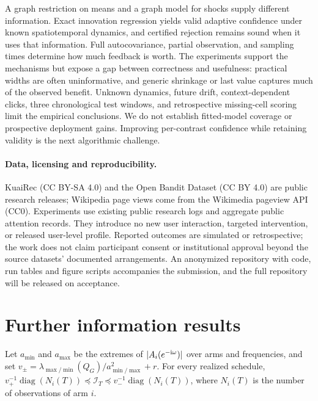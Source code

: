 \documentclass[sigconf,review,anonymous]{acmart}
\newcommand{\diag}{\operatorname{diag}}
\newcommand{\I}{\mathcal{I}}
\begin{document}
A graph restriction on means and a graph model for shocks supply different information. Exact innovation regression yields valid adaptive confidence under known spatiotemporal dynamics, and certified rejection remains sound when it uses that information. Full autocovariance, partial observation, and sampling times determine how much feedback is worth. The experiments support the mechanisms but expose a gap between correctness and usefulness: practical widths are often uninformative, and generic shrinkage or last value captures much of the observed benefit. Unknown dynamics, future drift, context-dependent clicks, three chronological test windows, and retrospective missing-cell scoring limit the empirical conclusions. We do not establish fitted-model coverage or prospective deployment gains. Improving per-contrast confidence while retaining validity is the next algorithmic challenge.

\paragraph{Data, licensing and reproducibility.} KuaiRec (CC BY-SA 4.0) and the Open Bandit Dataset (CC BY 4.0) are public research releases; Wikipedia page views come from the Wikimedia pageview API (CC0). Experiments use existing public research logs and aggregate public attention records. They introduce no new user interaction, targeted intervention, or released user-level profile. Reported outcomes are simulated or retrospective; the work does not claim participant consent or institutional approval beyond the source datasets' documented arrangements. An anonymized repository with code, run tables and figure scripts accompanies the submission, and the full repository will be released on acceptance.




\appendix

\section{Further information results}\label{app:info}

\begin{proposition}\label{prop:sandwich}
Let $a_{\min}$ and $a_{\max}$ be the extremes of $|A_i(e^{-{\rm i}\omega})|$ over arms and frequencies, and set $v_\pm=\lambda_{\max/\min}(Q_G)/a_{\min/\max}^2+r$. For every realized schedule, $v_+^{-1}\diag(N_i(T))\preceq\I_T\preceq v_-^{-1}\diag(N_i(T))$, where $N_i(T)$ is the number of observations of arm $i$.
\end{proposition}
\end{document}
